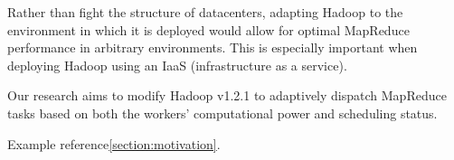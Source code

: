 \documentclass{sig-alternate}
\begin{document}
Rather than fight the structure of datacenters, adapting Hadoop to the environment
in which it is deployed would allow for optimal MapReduce performance in arbitrary
environments. This is especially important when deploying Hadoop using an IaaS 
(infrastructure as a service).

Our research aims to modify Hadoop v1.2.1 to adaptively dispatch MapReduce tasks
based on both the workers’ computational power and scheduling status.

Example reference\ref{section:motivation}.







{}

\end{document}
